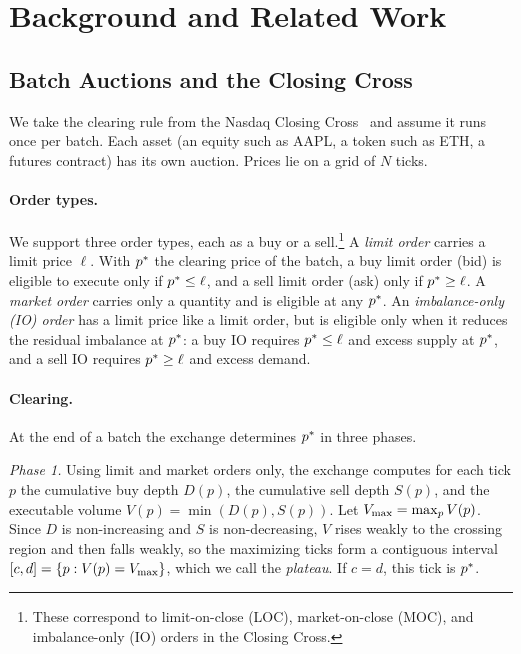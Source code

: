 \section{Background and Related Work}
\label{sec:background}

\subsection{Batch Auctions and the Closing Cross}
\label{sec:fba}

We take the clearing rule from the Nasdaq Closing Cross~\cite{nasdaq4754} and assume it runs once per batch. Each asset (an equity such as AAPL, a token such as ETH, a futures contract) has its own auction. Prices lie on a grid of $N$ ticks.

\paragraph{Order types.}
We support three order types, each as a buy or a sell.\footnote{These correspond to limit-on-close (LOC), market-on-close (MOC), and imbalance-only (IO) orders in the Closing Cross.} A \emph{limit order} carries a limit price $\ell$. With $p^{*}$ the clearing price of the batch, a buy limit order (bid) is eligible to execute only if $p^{*} \le \ell$, and a sell limit order (ask) only if $p^{*} \ge \ell$. A \emph{market order} carries only a quantity and is eligible at any $p^{*}$. An \emph{imbalance-only (IO) order} has a limit price like a limit order, but is eligible only when it reduces the residual imbalance at $p^{*}$: a buy IO requires $p^{*} \le \ell$ and excess supply at $p^{*}$, and a sell IO requires $p^{*} \ge \ell$ and excess demand.

\paragraph{Clearing.}
At the end of a batch the exchange determines $p^{*}$ in three phases.

\emph{Phase 1.} Using limit and market orders only, the exchange computes for each tick $p$ the cumulative buy depth $D(p)$, the cumulative sell depth $S(p)$, and the executable volume $V(p) = \min(D(p), S(p))$. Let $V_{\max} = \max_p V(p)$. Since $D$ is non-increasing and $S$ is non-decreasing, $V$ rises weakly to the crossing region and then falls weakly, so the maximizing ticks form a contiguous interval $[c,d] = \{p : V(p) = V_{\max}\}$, which we call the \emph{plateau}. If $c = d$, this tick is $p^{*}$.

